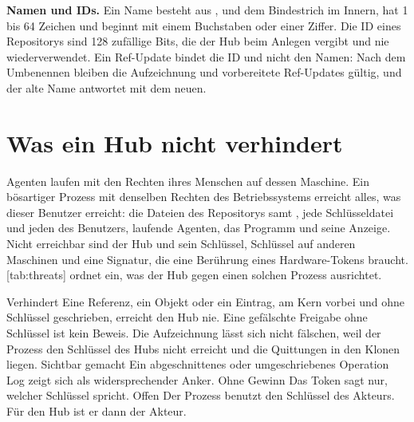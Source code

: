 \startinfobox
{\bf Namen und IDs.}
Ein Name besteht aus ,  und dem Bindestrich im Innern, hat 1 bis 64 Zeichen
und beginnt mit einem Buchstaben oder einer Ziffer.
Die ID eines Repositorys sind 128 zufällige Bits, die der Hub beim Anlegen vergibt und nie
wiederverwendet.
Ein Ref-Update bindet die ID und nicht den Namen: Nach dem Umbenennen bleiben die Aufzeichnung
und vorbereitete Ref-Updates gültig, und der alte Name antwortet mit dem neuen.
\stopinfobox

\section[sec:threat-model]{Was ein Hub nicht verhindert}

Agenten laufen mit den Rechten ihres Menschen auf dessen Maschine.
Ein bösartiger Prozess mit denselben Rechten des Betriebssystems erreicht alles, was dieser
Benutzer erreicht: die Dateien des Repositorys samt , jede Schlüsseldatei und jeden
 des Benutzers, laufende Agenten, das Programm  und seine Anzeige.
Nicht erreichbar sind der Hub und sein Schlüssel, Schlüssel auf anderen Maschinen und eine
Signatur, die eine Berührung eines Hardware-Tokens braucht.
[tab:threats] ordnet ein, was der Hub gegen einen solchen Prozess ausrichtet.

\startplacetable[title={Was der Hub gegen einen Prozess mit den Rechten des Akteurs ausrichtet},
reference=tab:threats]
\startxtable[frame=off,option=stretch]
\startxrow[topframe=on,bottomframe=on]
 \stopxcell
{} \stopxcell
\stopxrow
\startxrow
\startxcell Verhindert \stopxcell
\startxcell Eine Referenz, ein Objekt oder ein Eintrag, am Kern vorbei und ohne Schlüssel
geschrieben, erreicht den Hub nie.
Eine gefälschte Freigabe ohne Schlüssel ist kein Beweis.
Die Aufzeichnung lässt sich nicht fälschen, weil der Prozess den Schlüssel des Hubs nicht
erreicht und die Quittungen in den Klonen liegen. \stopxcell
\stopxrow
\startxrow
\startxcell Sichtbar gemacht \stopxcell
\startxcell Ein abgeschnittenes oder umgeschriebenes Operation Log zeigt sich als
widersprechender Anker. \stopxcell
\stopxrow
\startxrow
\startxcell Ohne Gewinn \stopxcell
\startxcell Das Token sagt nur, welcher Schlüssel spricht. \stopxcell
\stopxrow
\startxrow[bottomframe=on]
\startxcell Offen \stopxcell
\startxcell Der Prozess benutzt den Schlüssel des Akteurs.
Für den Hub ist er dann der Akteur. \stopxcell
\stopxrow
\stopxtable
\stopplacetable

